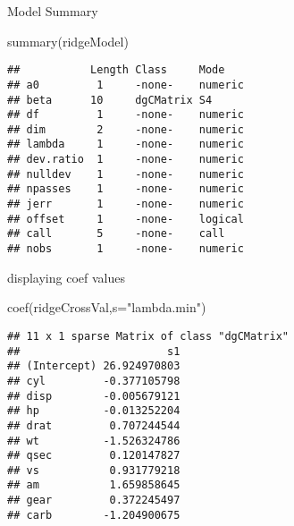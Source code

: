 \documentclass[
]{article}
\newenvironment{Shaded}{\begin{snugshade}}{\end{snugshade}}
\newcommand{\AttributeTok}[1]{\textcolor[rgb]{0.77,0.63,0.00}{#1}}
\newcommand{\DecValTok}[1]{\textcolor[rgb]{0.00,0.00,0.81}{#1}}
\newcommand{\FunctionTok}[1]{\textcolor[rgb]{0.00,0.00,0.00}{#1}}
\newcommand{\NormalTok}[1]{#1}
\newcommand{\OtherTok}[1]{\textcolor[rgb]{0.56,0.35,0.01}{#1}}
\newcommand{\SpecialCharTok}[1]{\textcolor[rgb]{0.00,0.00,0.00}{#1}}
\newcommand{\StringTok}[1]{\textcolor[rgb]{0.31,0.60,0.02}{#1}}
\begin{document}
Model Summary

\begin{Shaded}
\begin{Highlighting}[]
\FunctionTok{summary}\NormalTok{(ridgeModel)}
\end{Highlighting}
\end{Shaded}

\begin{verbatim}
##           Length Class     Mode   
## a0         1     -none-    numeric
## beta      10     dgCMatrix S4     
## df         1     -none-    numeric
## dim        2     -none-    numeric
## lambda     1     -none-    numeric
## dev.ratio  1     -none-    numeric
## nulldev    1     -none-    numeric
## npasses    1     -none-    numeric
## jerr       1     -none-    numeric
## offset     1     -none-    logical
## call       5     -none-    call   
## nobs       1     -none-    numeric
\end{verbatim}

displaying coef values

\begin{Shaded}
\begin{Highlighting}[]
\FunctionTok{coef}\NormalTok{(ridgeCrossVal,}\AttributeTok{s=}\StringTok{"lambda.min"}\NormalTok{)}
\end{Highlighting}
\end{Shaded}

\begin{verbatim}
## 11 x 1 sparse Matrix of class "dgCMatrix"
##                       s1
## (Intercept) 26.924970803
## cyl         -0.377105798
## disp        -0.005679121
## hp          -0.013252204
## drat         0.707244544
## wt          -1.526324786
## qsec         0.120147827
## vs           0.931779218
## am           1.659858645
## gear         0.372245497
## carb        -1.204900675
\end{verbatim}

\begin{Shaded}
\end{Shaded}
\end{document}
